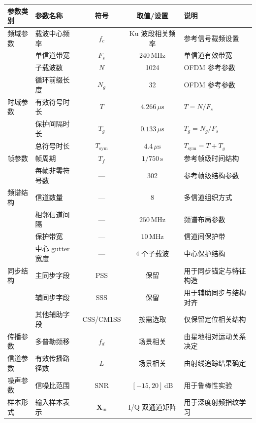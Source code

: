\begin{table}[htbp]
    \centering
    \label{tab:signal_params_ch3}
    \begin{tabular}{@{}llccl@{}}
        \toprule
        \textbf{参数类别} & \textbf{参数名称} & \textbf{符号} & \textbf{取值/设置} & \textbf{说明} \\ \midrule
        频域参数 & 载波中心频率 & \(f_c\) & Ku 波段相关频率 & 参考信号载频设置 \\
        & 单信道带宽 & \(F_s\) & \(240\,\mathrm{MHz}\) & 单信道有效带宽 \\
        & 子载波数 & \(N\) & 1024 & OFDM 参考参数 \\
        & 循环前缀长度 & \(N_g\) & 32 & OFDM 参考参数 \\
        时域参数 & 有效符号时长 & \(T\) & \(4.266\,\mu\mathrm{s}\) & \(T=N/F_s\) \\
        & 保护间隔时长 & \(T_g\) & \(0.133\,\mu\mathrm{s}\) & \(T_g=N_g/F_s\) \\
        & 总符号时长 & \(T_{\mathrm{sym}}\) & \(4.4\,\mu\mathrm{s}\) & \(T_{\mathrm{sym}}=T+T_g\) \\
        帧参数 & 帧周期 & \(T_f\) & \(1/750\,\mathrm{s}\) & 参考帧级时间结构 \\
        & 每帧非零符号数 & — & 302 & 参考帧级结构参数 \\
        频谱结构 & 信道数量 & — & 8 & 多信道组织方式 \\
        & 相邻信道间隔 & — & \(250\,\mathrm{MHz}\) & 频谱布局参数 \\
        & 保护带宽 & — & \(10\,\mathrm{MHz}\) & 信道间保护带 \\
        & 中心 gutter 宽度 & — & 4 个子载波 & 中心保护结构 \\
        同步结构 & 主同步字段 & PSS & 保留 & 用于同步锚定与特征构造 \\
        & 辅同步字段 & SSS & 保留 & 用于辅助同步与结构对齐 \\
        & 其他辅助字段 & CSS/CM1SS & 按需选取 & 仅保留定位相关结构 \\
        传播参数 & 多普勒频移 & \(f_d\) & 场景相关 & 由星地相对运动关系决定 \\
        信道参数 & 有效传播路径数 & \(L\) & 场景相关 & 由射线追踪结果确定 \\
        噪声参数 & 信噪比范围 & SNR & \([-15,20]\,\mathrm{dB}\) & 用于鲁棒性实验 \\
        样本形式 & 输入样本表示 & \(\mathbf{X}_{\mathrm{in}}\) & I/Q 双通道矩阵 & 用于深度射频指纹学习 \\ \bottomrule
    \end{tabular}
\end{table}

